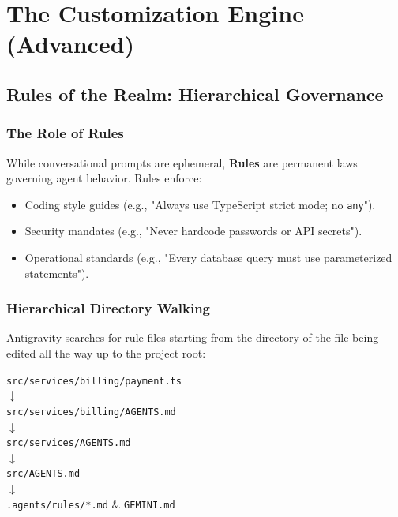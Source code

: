 \documentclass[11pt,a4paper,oneside]{book}
\begin{document}
\part{The Customization Engine (Advanced)}

\chapter{Rules of the Realm: Hierarchical Governance}

\section{The Role of Rules}
While conversational prompts are ephemeral, \textbf{Rules} are permanent laws governing agent behavior. Rules enforce:
\begin{itemize}
    \item Coding style guides (e.g., "Always use TypeScript strict mode; no \texttt{any}").
    \item Security mandates (e.g., "Never hardcode passwords or API secrets").
    \item Operational standards (e.g., "Every database query must use parameterized statements").
\end{itemize}

\section{Hierarchical Directory Walking}
Antigravity searches for rule files starting from the directory of the file being edited all the way up to the project root:

\begin{center}
\texttt{src/services/billing/payment.ts}\\
$\downarrow$\\
\texttt{src/services/billing/AGENTS.md}\\
$\downarrow$\\
\texttt{src/services/AGENTS.md}\\
$\downarrow$\\
\texttt{src/AGENTS.md}\\
$\downarrow$\\
\texttt{.agents/rules/*.md} $\&$ \texttt{GEMINI.md}
\end{center}
\end{document}
